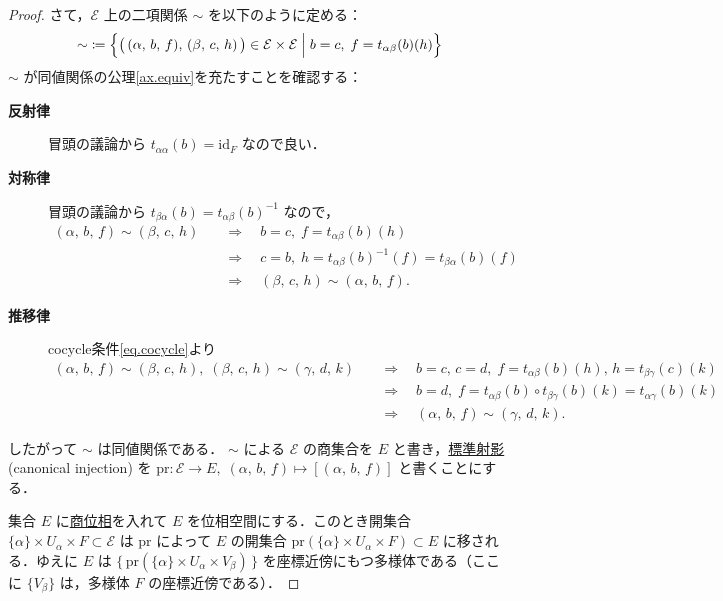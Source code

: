 \documentclass[geometry_main]{subfiles}
\begin{document}
\begin{proof}
	さて，$\mathcal{E}$ 上の二項関係 $\sim$ を以下のように定める：
	\begin{align}
		\label{eq.prop9-1_equiv}
		\sim\; \coloneqq \Bigl\{ \bigl( \, (\alpha,\, b,\, f),\, (\beta,\, c,\, h)\, \bigr) \in \mathcal{E} \times \mathcal{E} \Bigm| b=c,\; f = t_{\alpha\beta}(b)(h) \Bigr\} 
	\end{align}
	$\sim$ が同値関係の公理\ref{ax.equiv}を充たすことを確認する：
	\begin{description}
		\item[\textbf{反射律}] 冒頭の議論から $t_{\alpha\alpha}(b) = \mathrm{id}_F$ なので良い．
		\item[\textbf{対称律}] 冒頭の議論から $t_{\beta\alpha}(b) = t_{\alpha\beta}(b)^{-1}$  なので，
		\begin{align}
			(\alpha,\, b,\, f) \sim (\beta,\, c,\, h) \quad &\Longrightarrow \quad b=c,\; f = t_{\alpha\beta}(b)(h) \\
			&\Longrightarrow \quad c=b,\; h = t_{\alpha\beta}(b)^{-1}(f) = t_{\beta\alpha}(b)(f) \\
			&\Longrightarrow \quad (\beta,\, c,\, h) \sim (\alpha,\, b,\, f).
		\end{align}
		\item[\textbf{推移律}] cocycle条件\eqref{eq.cocycle}より
		\begin{align}
			(\alpha,\, b,\, f) \sim (\beta,\, c,\, h),\; (\beta,\, c,\, h) \sim (\gamma,\, d,\, k) \quad
			&\Longrightarrow \quad b=c,\, c=d,\; f = t_{\alpha\beta}(b)(h),\, h = t_{\beta\gamma}(c)(k) \\
			&\Longrightarrow \quad b=d,\; f = t_{\alpha\beta}(b) \circ t_{\beta\gamma}(b)(k) = t_{\alpha\gamma}(b)(k)  \\
			&\Longrightarrow \quad (\alpha,\, b,\, f) \sim (\gamma,\, d,\, k).
		\end{align}
	\end{description}
	したがって $\sim$ は同値関係である．
	$\sim$ による $\mathcal{E}$ の商集合を $E$ と書き，\hyperref[def.quo-proj]{標準射影} (canonical injection) を $\mathrm{pr} \colon \mathcal{E} \to E,\; (\alpha,\, b,\, f)  \mapsto [ (\alpha,\, b,\, f)]$ と書くことにする．

	集合 $E$ に\hyperref[def.quotopo]{商位相}を入れて $E$ を位相空間にする．このとき開集合 $\{\alpha\} \times U_\alpha \times F \subset \mathcal{E}$ は $\mathrm{pr}$ によって $E$ の開集合 $\mathrm{pr}(\{\alpha\} \times U_\alpha \times F) \subset{E}$ に移される．ゆえに $E$ は $\bigl\{\, \mathrm{pr}(\{\alpha\} \times U_\alpha \times V_\beta)\, \bigr\}$ を座標近傍にもつ\cinfty 多様体である（ここに $\{ V_\beta \}$ は，\cinfty 多様体 $F$ の座標近傍である）．
	

\end{proof}
\end{document}
